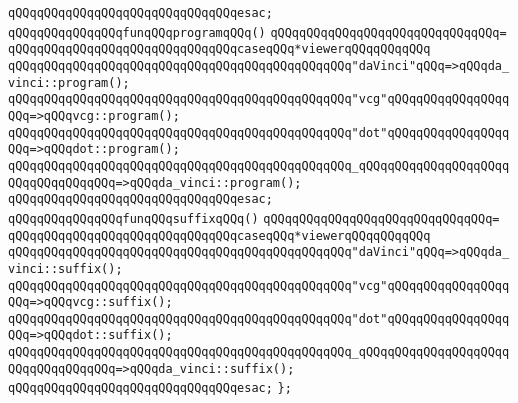 \verb|qQQqqQQqqQQqqQQqqQQqqQQqqQQqqQQqesac;|\newline
\newline
\verb|qQQqqQQqqQQqqQQqfunqQQqprogramqQQq()|\newline
\verb|qQQqqQQqqQQqqQQqqQQqqQQqqQQqqQQq=|\newline
\verb|qQQqqQQqqQQqqQQqqQQqqQQqqQQqqQQqcaseqQQq*viewerqQQqqQQqqQQq|\newline
\verb|qQQqqQQqqQQqqQQqqQQqqQQqqQQqqQQqqQQqqQQqqQQqqQQq"daVinci"qQQq=>qQQqda_vinci::program();|\newline
\verb|qQQqqQQqqQQqqQQqqQQqqQQqqQQqqQQqqQQqqQQqqQQqqQQq"vcg"qQQqqQQqqQQqqQQqqQQq=>qQQqvcg::program();|\newline
\verb|qQQqqQQqqQQqqQQqqQQqqQQqqQQqqQQqqQQqqQQqqQQqqQQq"dot"qQQqqQQqqQQqqQQqqQQq=>qQQqdot::program();|\newline
\verb|qQQqqQQqqQQqqQQqqQQqqQQqqQQqqQQqqQQqqQQqqQQqqQQq_qQQqqQQqqQQqqQQqqQQqqQQqqQQqqQQqqQQq=>qQQqda_vinci::program();|\newline
\verb|qQQqqQQqqQQqqQQqqQQqqQQqqQQqqQQqesac;|\newline
\newline
\verb|qQQqqQQqqQQqqQQqfunqQQqsuffixqQQq()|\newline
\verb|qQQqqQQqqQQqqQQqqQQqqQQqqQQqqQQq=|\newline
\verb|qQQqqQQqqQQqqQQqqQQqqQQqqQQqqQQqcaseqQQq*viewerqQQqqQQqqQQq|\newline
\verb|qQQqqQQqqQQqqQQqqQQqqQQqqQQqqQQqqQQqqQQqqQQqqQQq"daVinci"qQQq=>qQQqda_vinci::suffix();|\newline
\verb|qQQqqQQqqQQqqQQqqQQqqQQqqQQqqQQqqQQqqQQqqQQqqQQq"vcg"qQQqqQQqqQQqqQQqqQQq=>qQQqvcg::suffix();|\newline
\verb|qQQqqQQqqQQqqQQqqQQqqQQqqQQqqQQqqQQqqQQqqQQqqQQq"dot"qQQqqQQqqQQqqQQqqQQq=>qQQqdot::suffix();|\newline
\verb|qQQqqQQqqQQqqQQqqQQqqQQqqQQqqQQqqQQqqQQqqQQqqQQq_qQQqqQQqqQQqqQQqqQQqqQQqqQQqqQQqqQQq=>qQQqda_vinci::suffix();|\newline
\verb|qQQqqQQqqQQqqQQqqQQqqQQqqQQqqQQqesac;|\newline
\verb|};|\newline

